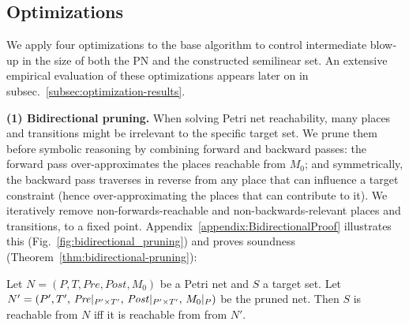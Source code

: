 %


\subsection{Optimizations}
\label{sec:optimizations}


We apply four optimizations to the base algorithm to control intermediate blow‐up in the size of both the PN and the constructed semilinear set. 
%
An extensive empirical evaluation of these optimizations appears later on in subsec.~\ref{subsec:optimization-results}.

\medskip
\noindent
\textbf{(1) Bidirectional pruning.}  
When solving Petri net reachability, many places and transitions might be irrelevant to the specific target set.  
	We prune them before symbolic reasoning by combining forward and backward passes:  
	the forward pass over-approximates the places reachable from $M_0$; and symmetrically,   
	the backward pass traverses in reverse from any place that can influence a target constraint (hence over-approximating the places that can contribute to it).
	We iteratively remove non-forwards-reachable and
	non-backwards-relevant places and transitions, to a fixed point.  
	Appendix~\ref{appendix:BidirectionalProof} illustrates this (Fig.~\ref{fig:bidirectional_pruning}) and proves soundness (Theorem~\ref{thm:bidirectional-pruning}):



\begin{theorem}
	\label{thm:bidirectional-pruning}
	Let $N = (P, T, Pre, Post, M_0)$ be a Petri net and $S$ a target set.  
	Let $N' = (P',T',\,\mathit{Pre}|_{P'\times T'},\,\mathit{Post}|_{P'\times T'},\,M_0|_{P})$ be the pruned net.  
	Then $S$ is reachable from $N$ iff it is reachable from from $N'$.
\end{theorem}
%
%

